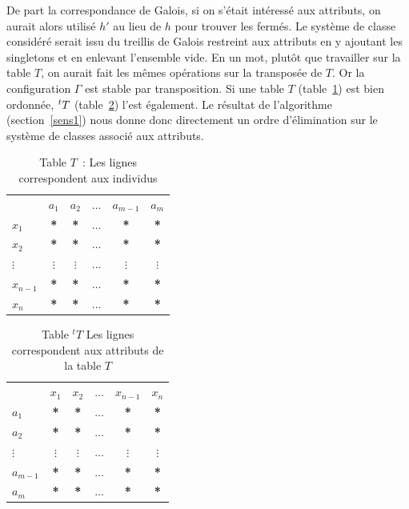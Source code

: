 \documentclass[a4paper]{report}
\renewcommand{\textbf}[1]{\begingroup\bfseries\mathversion{bold}#1\endgroup}
\begin{document}
De part la correspondance de Galois, si on s'était intéressé aux attributs, on aurait alors utilisé $h'$ au lieu de $h$ pour trouver les fermés. Le système de classe considéré serait issu du treillis de Galois restreint aux attributs en 
y ajoutant les singletons et en enlevant l'ensemble vide. En un mot, plutôt que travailler sur la table $T$, on aurait fait les mêmes opérations sur la transposée de $T$.
Or la configuration $\Gamma$ est stable par transposition. Si une table $T$ (table~\ref{nontrans}) est bien ordonnée, $\mathstrut^t T$ (table~\ref{trans}) l'est également. 
Le résultat de l'algorithme (section~\ref{sens1}) nous donne donc directement un ordre d'élimination sur le système de classes associé aux attributs.


\begin{table}[htb]
  \centering
\begin{tabular}{lccccc}
 & $a_1$ & $a_2$ & $\hdots$ & $a_{m-1}$ & $a_m$\\
$x_1$ & \textbf{*} & \textbf{*} & $\hdots$ & \textbf{*} & \textbf{*}\\
$x_2$ & \textbf{*} & \textbf{*} & $\hdots$ & \textbf{*} & \textbf{*}\\
$\vdots$ & $\vdots$ & $\vdots$ & $\hdots$ & $\vdots$ & $\vdots$\\
$x_{n-1}$ & \textbf{*} & \textbf{*} & $\hdots$ & \textbf{*} & \textbf{*}\\
$x_n$ & \textbf{*} & \textbf{*} & $\hdots$ & \textbf{*} & \textbf{*}
\end{tabular}
\caption{Table $T$~: Les lignes correspondent aux individus}
\label{nontrans}
\end{table}

\begin{table}[htb]
  \centering
\begin{tabular}{lccccc}
 & $x_1$ & $x_2$ & $\hdots$ & $x_{n-1}$ & $x_n$\\
$a_1$ & \textbf{*} & \textbf{*} & $\hdots$ & \textbf{*} & \textbf{*}\\
$a_2$ & \textbf{*} & \textbf{*} & $\hdots$ & \textbf{*} & \textbf{*}\\
$\vdots$ & $\vdots$ & $\vdots$ & $\hdots$ & $\vdots$ & $\vdots$\\
$a_{m-1}$ & \textbf{*} & \textbf{*} & $\hdots$ & \textbf{*} & \textbf{*}\\
$a_m$ & \textbf{*} & \textbf{*} & $\hdots$ & \textbf{*} & \textbf{*}
\end{tabular}
\caption{Table ${}^t T$ Les lignes correspondent aux attributs de la table $T$}
\label{trans}
\end{table}
 
\end{document}
